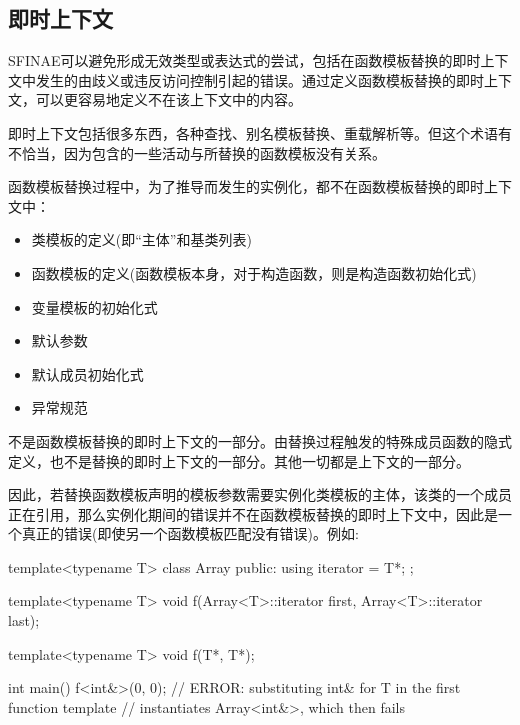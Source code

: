 \subsection{即时上下文}

SFINAE可以避免形成无效类型或表达式的尝试，包括在函数模板替换的即时上下文中发生的由歧义或违反访问控制引起的错误。通过定义函数模板替换的即时上下文，可以更容易地定义不在该上下文中的内容。

\begin{notice}
即时上下文包括很多东西，各种查找、别名模板替换、重载解析等。但这个术语有不恰当，因为包含的一些活动与所替换的函数模板没有关系。
\end{notice}

函数模板替换过程中，为了推导而发生的实例化，都不在函数模板替换的即时上下文中：

\begin{itemize}
\item 
类模板的定义(即“主体”和基类列表)

\item 
函数模板的定义(函数模板本身，对于构造函数，则是构造函数初始化式)

\item 
变量模板的初始化式

\item 
默认参数

\item 
默认成员初始化式

\item 
异常规范
\end{itemize}

不是函数模板替换的即时上下文的一部分。由替换过程触发的特殊成员函数的隐式定义，也不是替换的即时上下文的一部分。其他一切都是上下文的一部分。

因此，若替换函数模板声明的模板参数需要实例化类模板的主体，该类的一个成员正在引用，那么实例化期间的错误并不在函数模板替换的即时上下文中，因此是一个真正的错误(即使另一个函数模板匹配没有错误)。例如:

\begin{cpp}
template<typename T>
class Array {
	public:
	using iterator = T*;
};

template<typename T>
void f(Array<T>::iterator first, Array<T>::iterator last);

template<typename T>
void f(T*, T*);

int main()
{
	f<int&>(0, 0); // ERROR: substituting int& for T in the first function template
} // instantiates Array<int&>, which then fails
\end{cpp}

